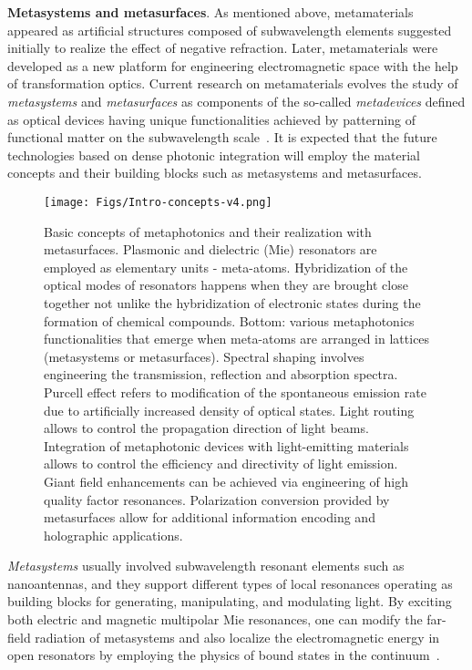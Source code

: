 \documentclass[journal=chreay,manuscript=review]{achemso}
\begin{document}
{\bf Metasystems and metasurfaces}.  As mentioned above, metamaterials appeared as artificial structures composed of subwavelength elements suggested initially to realize the effect of negative refraction. 
Later, metamaterials were developed as a new platform for engineering electromagnetic space with the help of transformation optics. Current research on metamaterials evolves the study of {\it metasystems} and {\it metasurfaces} as components of the so-called {\it metadevices} defined as optical devices having unique functionalities achieved by patterning of functional matter on the subwavelength scale~\cite{metadevices}. It is expected that the future technologies based on dense photonic integration will employ the material concepts and their building blocks such as metasystems and metasurfaces. 

\begin{figure}[ht!]
    \centering
    \texttt{[image: Figs/Intro-concepts-v4.png]}
    \caption{Basic concepts of metaphotonics and their realization with metasurfaces. Plasmonic and dielectric (Mie) resonators are employed as elementary units - meta-atoms. Hybridization of the optical modes of resonators happens when they are brought close together not unlike the hybridization of electronic states during the formation of chemical compounds. Bottom: various metaphotonics functionalities that emerge when meta-atoms are arranged in lattices (metasystems or metasurfaces). Spectral shaping involves engineering the transmission, reflection and absorption spectra. Purcell effect refers to modification of the spontaneous emission rate due to artificially increased density of optical states. Light routing allows to control the propagation direction of light beams. Integration of metaphotonic devices with light-emitting materials allows to control the efficiency and directivity of light emission. Giant field enhancements can be achieved via engineering of high quality factor resonances. Polarization conversion provided by metasurfaces allow for additional information encoding and holographic applications. }
    \label{fig:Concepts}
\end{figure}

{\it Metasystems} usually involved subwavelength resonant elements such as nanoantennas, and they support different types of local resonances operating as building blocks for generating, manipulating, and modulating light. By exciting both electric and magnetic multipolar Mie resonances, one can modify the far-field radiation of metasystems and also localize the electromagnetic energy in open resonators by employing the physics of bound states in the continuum~\cite{BIC_2019}.
\end{document}
